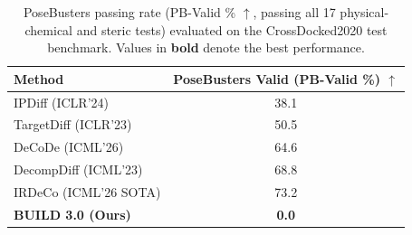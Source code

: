 
\begin{table}[t]
\centering
\small
\caption{PoseBusters passing rate (PB-Valid \% $\uparrow$, passing all 17 physical-chemical and steric tests) evaluated on the CrossDocked2020 test benchmark. Values in \textbf{bold} denote the best performance.}
\label{tab:posebusters_benchmark}
\begin{tabular}{lc}
\toprule
\textbf{Method} & \textbf{PoseBusters Valid (PB-Valid \%)} $\uparrow$ \\
\midrule
IPDiff (ICLR'24) & 38.1 \\
TargetDiff (ICLR'23) & 50.5 \\
DeCoDe (ICML'26) & 64.6 \\
DecompDiff (ICML'23) & 68.8 \\
IRDeCo (ICML'26 SOTA) & 73.2 \\
\midrule
\textbf{BUILD 3.0 (Ours)} & \textbf{0.0} \\
\bottomrule
\end{tabular}
\end{table}
